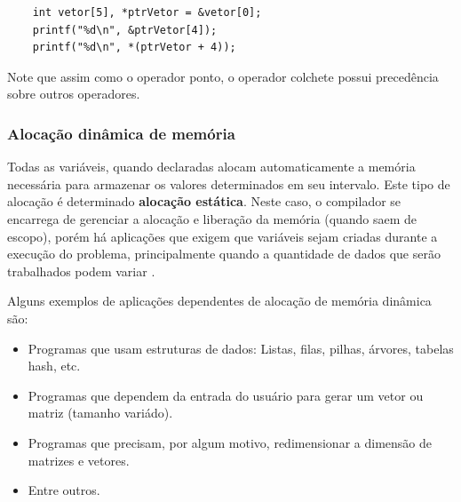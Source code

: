 \documentclass[12pt]{article}
\newcommand\tab[1][1cm]{\hspace*{#1}}
\begin{document}
\hspace{0.25cm}
\begin{lstlisting}
    int vetor[5], *ptrVetor = &vetor[0];
    printf("%d\n", &ptrVetor[4]);
    printf("%d\n", *(ptrVetor + 4));
\end{lstlisting}

\hspace{0.25cm}
\begin{tcolorbox}[colback=yellow!5!white,colframe=yellow!75!black,title=Atenção!]
  \par\tab Note que assim como o operador ponto, o operador colchete possui precedência sobre outros operadores.
\end{tcolorbox}

\subsubsection{Alocação dinâmica de memória}

\par\tab Todas as variáveis, quando declaradas alocam automaticamente a memória necessária para armazenar os valores determinados em seu intervalo. Este tipo de alocação é determinado \textbf{alocação estática}. Neste caso, o compilador se encarrega de gerenciar a alocação e liberação da memória (quando saem de escopo), porém há aplicações que exigem que variáveis sejam criadas durante a execução do problema, principalmente quando a quantidade de dados que serão trabalhados podem variar \cite{site:malloc_free}.

\hspace{0.25cm}
\begin{tcolorbox}[colback=green!5!white,colframe=green!75!black,title=Curiosidade]
  \par\tab Alguns exemplos de aplicações dependentes de alocação de memória dinâmica são:
  \begin{itemize}
      \item Programas que usam estruturas de dados: Listas, filas, pilhas, árvores, tabelas hash, etc.
      \item Programas que dependem da entrada do usuário para gerar um vetor ou matriz (tamanho variádo).
      \item Programas que precisam, por algum motivo, redimensionar a dimensão de matrizes e vetores.
      \item Entre outros.
  \end{itemize}
\end{tcolorbox}
\end{document}

